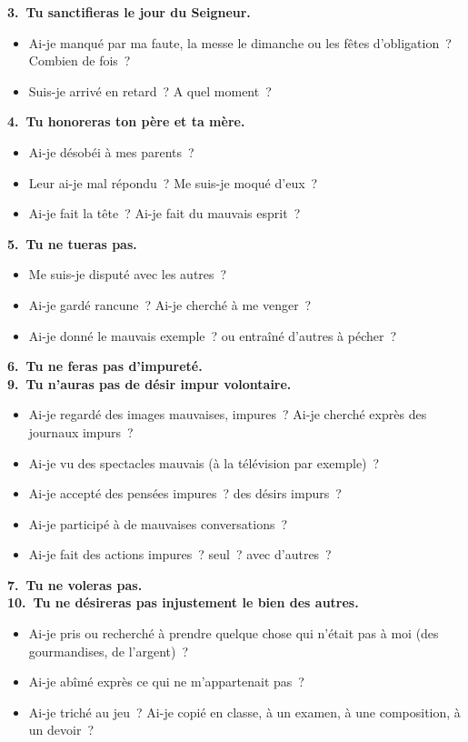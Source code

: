 \documentclass[%
a5paper%
,11pt%
,DIV=15%
,titlepage=on%
,headings=optiontoheadandtoc%
,headings=small%
,parskip=false%
,openany%
]{scrbook}
\newcommand{\commandement}[1]{\noindent\textbf{#1}}
\begin{document}
\commandement{3. Tu sanctifieras le jour du Seigneur.}
\begin{itemize}
\item Ai-je manqué par ma faute, la messe le dimanche ou les fêtes d’obligation ? Combien de fois ?
\item Suis-je arrivé en retard ? A quel moment ?
\end{itemize}

\commandement{4. Tu honoreras ton père et ta mère.}
\begin{itemize}
\item Ai-je désobéi à mes parents ?
\item Leur ai-je mal répondu ? Me suis-je moqué d’eux ?
\item Ai-je fait la tête ? Ai-je fait du mauvais esprit ?
\end{itemize}

\commandement{5. Tu ne tueras pas.}
\begin{itemize}
\item Me suis-je disputé avec les autres ?
\item Ai-je gardé rancune ? Ai-je cherché à me venger ?
\item Ai-je donné le mauvais exemple ? ou entraîné d’autres à pécher ?
\end{itemize}

\commandement{6. Tu ne feras pas d'impureté.\\
9. Tu n'auras pas de désir impur volontaire.}
\begin{itemize}
\item Ai-je regardé des images mauvaises, impures ? Ai-je cherché exprès des journaux impurs ?
\item Ai-je vu des spectacles mauvais (à la télévision par exemple) ?
\item Ai-je accepté des pensées impures ? des désirs impurs ?
\item Ai-je participé à de mauvaises conversations ?
\item Ai-je fait des actions impures ? seul ? avec d’autres ?
\end{itemize}

\commandement{7. Tu ne voleras pas.\\
10. Tu ne désireras pas injustement le bien des autres.}
\begin{itemize}
\item Ai-je pris ou recherché à prendre quelque chose qui n’était pas à moi (des gourmandises, de l’argent) ?
\item Ai-je abîmé exprès ce qui ne m’appartenait pas ?
\item Ai-je triché au jeu ? Ai-je copié en classe, à un examen, à une composition, à un devoir ?
\end{itemize}
\end{document}
